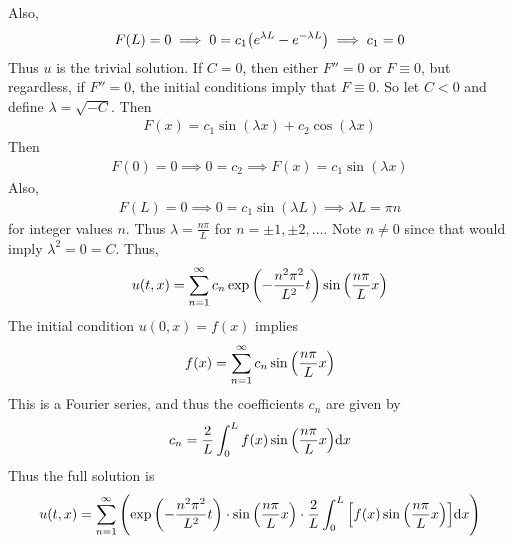 \documentclass[12pt]{article}
\theoremstyle{plain}
\begin{document}
Also,
\begin{align*}
    F(L) = 0 \implies 0 = c_1\qty(e^{\lambda L} - e^{-\lambda L}) \implies c_1 = 0
\end{align*}
Thus $u$ is the trivial solution.  If $C = 0$, then either $F'' = 0$ or $F \equiv 0$, but regardless, if $F'' = 0$, the initial conditions imply that $F \equiv 0$.  So let $C < 0$ and define $\lambda = \sqrt{-C}$.  Then
\begin{align*}
    F(x) = c_1 \sin(\lambda x) + c_2 \cos(\lambda x)
\end{align*}
Then
\begin{align*}
    F(0) = 0 \implies 0 = c_2 \implies F(x) = c_1 \sin(\lambda x)
\end{align*}
Also,
\begin{align*}
    F(L) = 0 \implies 0 = c_1 \sin(\lambda L) \implies \lambda L = \pi n
\end{align*}
for integer values $n$.  Thus $\lambda = \frac{n\pi}{L}$ for $n = \pm 1, \pm 2, \dots$.  Note $n \neq 0$ since that would imply $\lambda^2 = 0 = C$.  Thus,
\begin{align*}
    u(t,x) = \sum_{n=1}^\infty c_n \exp\qty(-\frac{n^2 \pi^2}{L^2}t)\sin\qty(\frac{n\pi}{L}x)
\end{align*}
The initial condition $u(0,x) = f(x)$ implies
\begin{align*}
    f(x) = \sum_{n=1}^\infty c_n\sin\qty(\frac{n\pi}{L}x)
\end{align*}
This is a Fourier series, and thus the coefficients $c_n$ are given by
\begin{align*}
    c_n = \frac{2}{L}\int_0^L f(x) \sin\qty(\frac{n\pi}{L}x)\dd x
\end{align*}
Thus the full solution is
\begin{align*}
    u(t,x) = \sum_{n=1}^\infty \qty(\exp\qty(-\frac{n^2 \pi^2}{L^2}t)\cdot\sin\qty(\frac{n\pi}{L}x)\cdot \frac{2}{L}\int_0^L \qty[f(x) \sin\qty(\frac{n\pi}{L}x)]\dd x)
\end{align*}
\end{document}
